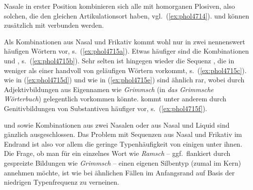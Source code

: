 Nasale in erster Position kombinieren sich alle mit homorganen Plosiven, also solchen, die den gleichen Artikulationsort haben, vgl.\ (\ref{ex:phol4714}).
\textipa{[m]} und \textipa{[N]} können zusätzlich mit \textipa{[t]} verbunden werden.

\begin{exe}
  \ex\label{ex:phol4714}
  \begin{xlist}
  \end{xlist}
\end{exe}

Als Kombinationen aus Nasal und Frikativ kommt \textipa{[n\c{c}]} wohl nur in zwei nennenswert häufigen Wörtern vor, s.\ (\ref{ex:phol4715a}).
Etwas häufiger sind die Kombinationen \textipa{[nf]} und \textipa{[ns]}, s.\ (\ref{ex:phol4715b}).
Sehr selten ist hingegen wieder die Sequenz \textipa{[nS]}, die in weniger als einer handvoll von geläufigen Wörtern vorkommt, s.\ (\ref{ex:phol4715c}).
\textipa{[ms]} wie in (\ref{ex:phol4715d}) und \textipa{[mS]} wie in (\ref{ex:phol4715e}) sind ähnlich rar, wobei \textipa{[mS]} durch Adjektivbildungen aus Eigennamen wie \textit{Grimmsch} (in \textit{das Grimmsche Wörterbuch}) gelegentlich vorkommen könnte.
\textipa{[Ns]} kommt unter anderem durch Genitivbildungen von Substantiven häufiger vor, s.\ (\ref{ex:phol4715f}).

\begin{exe}
  \ex\label{ex:phol4715}
  \begin{xlist}
  \end{xlist}
\end{exe}

\textipa{[mf]} und \textipa{[Nf]} sowie Kombinationen aus zwei Nasalen oder aus Nasal und Liquid sind gänzlich ausgeschlossen.
Das Problem mit Sequenzen aus Nasal und Frikativ im Endrand ist also vor allem die geringe Typenhäufigkeit von einigen unter ihnen.
Die Frage, ob man \zB für ein einzelnes Wort wie \textit{Ramsch} -- ggf.\ flankiert durch gespreizte Bildungen wie \textit{Grimmsch} -- einen eigenen Silbentyp (zumal im Kern) annehmen möchte, ist wie bei ähnlichen Fällen im Anfangsrand auf Basis der niedrigen Typenfrequenz zu verneinen.

